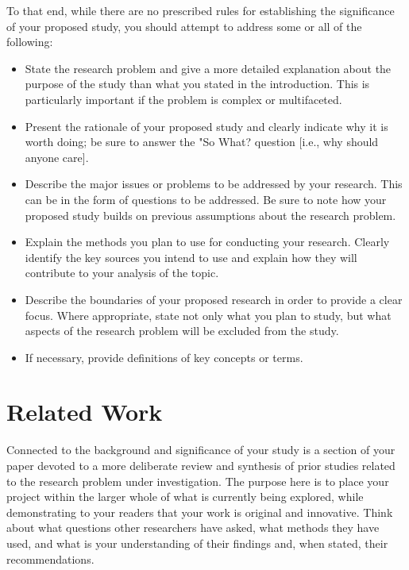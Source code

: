 \documentclass[10pt,twocolumn,letterpaper]{article}
\begin{document}
To that end, while there are no prescribed rules for establishing the significance of your proposed study, you should attempt to address some or all of the following:

\begin{itemize}
   \item State the research problem and give a more detailed explanation about the purpose of the study than what you stated in the introduction. This is particularly important if the problem is complex or multifaceted.
    \item Present the rationale of your proposed study and clearly indicate why it is worth doing; be sure to answer the "So What? question [i.e., why should anyone care].
    \item Describe the major issues or problems to be addressed by your research. This can be in the form of questions to be addressed. Be sure to note how your proposed study builds on previous assumptions about the research problem.
    \item Explain the methods you plan to use for conducting your research. Clearly identify the key sources you intend to use and explain how they will contribute to your analysis of the topic.
   \item Describe the boundaries of your proposed research in order to provide a clear focus. Where appropriate, state not only what you plan to study, but what aspects of the research problem will be excluded from the study.
   \item If necessary, provide definitions of key concepts or terms.
\end{itemize}

\section{Related Work}

Connected to the background and significance of your study is a section of your paper devoted to a more deliberate review and synthesis of prior studies related to the research problem under investigation. The purpose here is to place your project within the larger whole of what is currently being explored, while demonstrating to your readers that your work is original and innovative. Think about what questions other researchers have asked, what methods they have used, and what is your understanding of their findings and, when stated, their recommendations.
\end{document}
